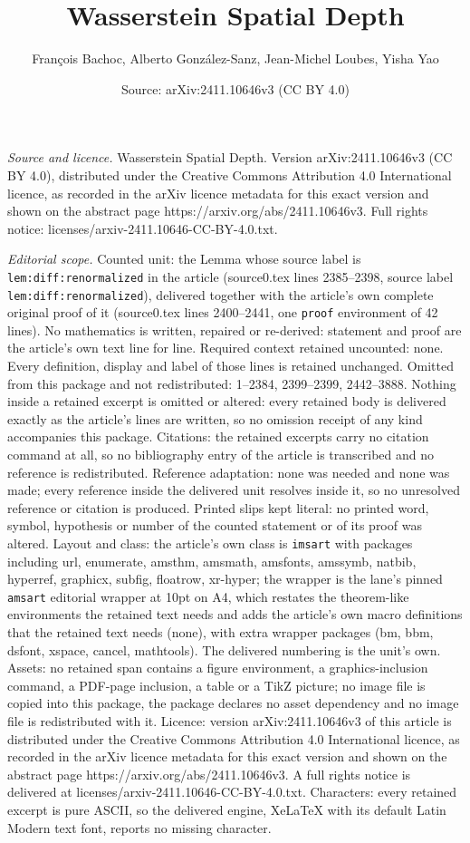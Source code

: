 \documentclass[10pt,a4paper]{amsart}
\title[Wasserstein Spatial Depth]{Wasserstein Spatial Depth}
\author{Fran\c{c}ois Bachoc, Alberto Gonz\'alez-Sanz, Jean-Michel Loubes, Yisha Yao}
\date{Source: arXiv:2411.10646v3 (CC BY 4.0)}
\begin{document}
\maketitle

\noindent\emph{Source and licence.} Wasserstein Spatial Depth. Version arXiv:2411.10646v3 (CC BY 4.0), distributed under the Creative Commons Attribution 4.0 International licence, as recorded in the arXiv licence metadata for this exact version and shown on the abstract page https://arxiv.org/abs/2411.10646v3. Full rights notice: licenses/arxiv-2411.10646-CC-BY-4.0.txt.\par\smallskip

\noindent\textit{Editorial scope.} Counted unit: the Lemma whose source label is \texttt{lem:diff:renormalized} in the article (source0.tex lines 2385--2398, source label \texttt{lem:diff:renormalized}), delivered together with the article's own complete original proof of it (source0.tex lines 2400--2441, one \texttt{proof} environment of 42 lines). No mathematics is written, repaired or re-derived: statement and proof are the article's own text line for line. Required context retained uncounted: none. Every definition, display and label of those lines is retained unchanged. Omitted from this package and not redistributed: 1--2384, 2399--2399, 2442--3888. Nothing inside a retained excerpt is omitted or altered: every retained body is delivered exactly as the article's lines are written, so no omission receipt of any kind accompanies this package. Citations: the retained excerpts carry no citation command at all, so no bibliography entry of the article is transcribed and no reference is redistributed. Reference adaptation: none was needed and none was made; every reference inside the delivered unit resolves inside it, so no unresolved reference or citation is produced. Printed slips kept literal: no printed word, symbol, hypothesis or number of the counted statement or of its proof was altered. Layout and class: the article's own class is \texttt{imsart} with packages including url, enumerate, amsthm, amsmath, amsfonts, amssymb, natbib, hyperref, graphicx, subfig, floatrow, xr-hyper; the wrapper is the lane's pinned \texttt{amsart} editorial wrapper at 10pt on A4, which restates the theorem-like environments the retained text needs and adds the article's own macro definitions that the retained text needs (none), with extra wrapper packages (bm, bbm, dsfont, xspace, cancel, mathtools). The delivered numbering is the unit's own. Assets: no retained span contains a figure environment, a graphics-inclusion command, a PDF-page inclusion, a table or a TikZ picture; no image file is copied into this package, the package declares no asset dependency and no image file is redistributed with it. Licence: version arXiv:2411.10646v3 of this article is distributed under the Creative Commons Attribution 4.0 International licence, as recorded in the arXiv licence metadata for this exact version and shown on the abstract page https://arxiv.org/abs/2411.10646v3. A full rights notice is delivered at licenses/arxiv-2411.10646-CC-BY-4.0.txt. Characters: every retained excerpt is pure ASCII, so the delivered engine, XeLaTeX with its default Latin Modern text font, reports no missing character.
\end{document}
